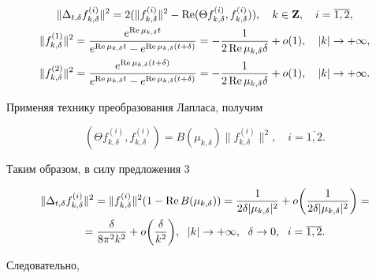 \begin{pf}
\begin{gather*}
\|\Delta_{t,\delta}f_{k,\delta}^{(i)}\|^2=2(\|f_{k,\delta}^{(i)}\|^2-


\re(\Theta f_{k,\delta}^{(i)},f_{k,\delta}^{(i)})),\quad


k\in \bold Z,\quad i=\overline {1,2}, \\


%


\|f_{k,\delta}^{(1)}\|^2=


\frac{e^{\re\mu_{k,\delta}t}}{e^{\re\mu_{k,\delta}t}-


e^{\re\mu_{k,\delta}(t+\delta)}}=


-\frac {1}{2\re\mu_{k,\delta}\delta}+o(1),


\quad |k|\to +\infty, \\


%


\|f_{k,\delta}^{(2)}\|^2=\frac {e^{\re\mu_{k,\delta}(t+\delta)}}


{e^{\re\mu_{k,\delta}t}-e^{\re\mu_{k,\delta}(t+\delta)}}=


-\frac {1}{2\re\mu_{k,\delta}\delta}+o(1),\quad |k|\to +\infty.


\end{gather*}


Применяя технику преобразования Лапласа, получим


$$


(\Theta f_{k,\delta}^{(i)},f_{k,\delta}^{(i)})=B(\mu_{k,\delta})


\|f_{k,\delta}^{(i)}\|^2,\quad i=\overline {1,2}.


$$


Таким образом, в силу предложения 3


\begin{multline*}


\|\Delta_{t,\delta}f_{k,\delta}^{(i)}\|^2=


\|f_{k,\delta}^{(i)}\|^2(1-\re B(\mu_{k,\delta}))=\frac {1}


{2\delta |\mu_{k,\delta}|^2}+o\bigg(


\frac {1}{2\delta |\mu_{k,\delta}|^2}\bigg)= \\


%


=\frac {\delta}{8\pi ^2k^2}+o\bigg(\frac {\delta}{k^2}\bigg),\ \;


|k|\to +\infty,\ \; \delta \to 0,\ \; i=\overline {1,2}.


\end{multline*}


Следовательно,



\end{pf}
